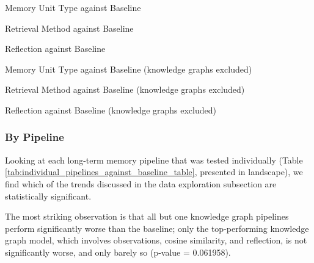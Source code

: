 \begin{table}[p]
\centering
\tiny

\caption{Memory Unit Type against Baseline}
\label{tab:memory_unit_type_against_baseline_table}
\end{table}

\begin{table}[p]
\centering
\tiny

\caption{Retrieval Method against Baseline}
\label{tab:retrieval_method_against_baseline_table}
\end{table}

\begin{table}[p]
\centering
\tiny

\caption{Reflection against Baseline}
\label{tab:reflection_against_baseline_table}
\end{table}

\begin{table}[p]
\centering
\tiny

\caption{Memory Unit Type against Baseline (knowledge graphs excluded)}
\label{tab:memory_unit_type_against_baseline_table_no_kg}
\end{table}

\begin{table}[p]
\centering
\tiny

\caption{Retrieval Method against Baseline (knowledge graphs excluded)}
\label{tab:retrieval_method_against_baseline_table_no_kg}
\end{table}

\begin{table}[p]
\centering
\tiny

\caption{Reflection against Baseline (knowledge graphs excluded)}
\label{tab:reflection_against_baseline_table_no_kg}
\end{table}


\subsubsection{By Pipeline}

Looking at each long-term memory pipeline that was tested individually (Table \ref{tab:individual_pipelines_against_baseline_table}, presented in landscape), we find which of the trends discussed in the data exploration subsection are statistically significant. 

The most striking observation is that all but one knowledge graph pipelines perform significantly worse than the baseline; only the top-performing knowledge graph model, which involves observations, cosine similarity, and reflection, is not significantly worse, and only barely so (p-value = 0.061958).

